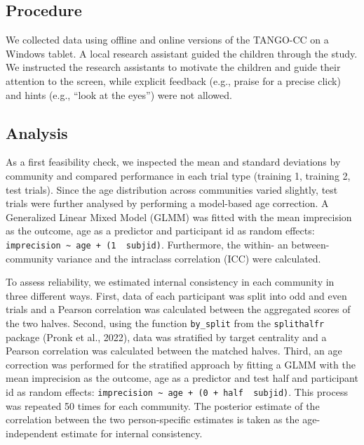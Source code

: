 \documentclass[
  man,mask,floatsintext]{apa7}
\begin{document}
\hypertarget{procedure}{%
\subsection{Procedure}\label{procedure}}

We collected data using offline and online versions of the TANGO-CC on a Windows tablet. A local research assistant guided the children through the study. We instructed the research assistants to motivate the children and guide their attention to the screen, while explicit feedback (e.g., praise for a precise click) and hints (e.g., ``look at the eyes'') were not allowed.

\hypertarget{analysis}{%
\subsection{Analysis}\label{analysis}}

As a first feasibility check, we inspected the mean and standard deviations by community and compared performance in each trial type (training 1, training 2, test trials). Since the age distribution across communities varied slightly, test trials were further analysed by performing a model-based age correction. A Generalized Linear Mixed Model (GLMM) was fitted with the mean imprecision as the outcome, age as a predictor and participant id as random effects: \texttt{imprecision\ \textasciitilde{}\ age\ +\ (1\ \textbar{}\ subjid)}. Furthermore, the within- an between-community variance and the intraclass correlation (ICC) were calculated.

To assess reliability, we estimated internal consistency in each community in three different ways. First, data of each participant was split into odd and even trials and a Pearson correlation was calculated between the aggregated scores of the two halves. Second, using the function \texttt{by\_split} from the \texttt{splithalfr} package (Pronk et al., 2022), data was stratified by target centrality and a Pearson correlation was calculated between the matched halves. Third, an age correction was performed for the stratified approach by fitting a GLMM with the mean imprecision as the outcome, age as a predictor and test half and participant id as random effects: \texttt{imprecision\ \textasciitilde{}\ age\ +\ (0\ +\ half\ \textbar{}\ subjid)}. This process was repeated 50 times for each community. The posterior estimate of the correlation between the two person-specific estimates is taken as the age-independent estimate for internal consistency.
\end{document}
